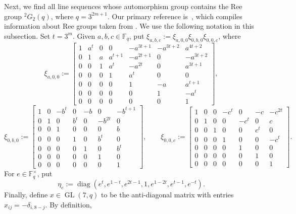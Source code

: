 Next, we find all line sequences whose automorphism group contains the Ree group ${}^2G_2(q)$, where $q = 3^{2m+1}$.
Our primary reference is~\cite[Section~3]{Baarnhielm:14}, which compiles information about Ree groups taken from \cite{HuppertB:82:III,KemperLM:01,Levchuk:85,Ward:66,Wilson:09}.
We use the following notation in this subsection.
Set $t = 3^m$.
Given $a,b,c \in \mathbb{F}_q$, put $\xi_{a,b,c} := \xi_{a,0,0} \xi_{0,b,0} \xi_{0,0,c}$, where
\[
\xi_{a,0,0}
:=
\left[ \begin{array}{ccccccc}
1 & a^t & 0 & 0 & -a^{3t+1} & -a^{3t+2} & a^{4t+2} \\
0 & 1 & a & a^{t+1} & -a^{2t+1} & 0 & -a^{3t+2} \\
0 & 0 & 1 & a^t & -a^{2t} & 0 & a^{3t+1} \\
0 & 0 & 0 & 1 & a^t & 0 & 0 \\
0 & 0 & 0 & 0 & 1 & -a & a^{t+1} \\
0 & 0 & 0 & 0 & 0 & 1 & -a^t \\
0 & 0 & 0 & 0 & 0 & 0 & 1
\end{array} \right],
\]
\[
\xi_{0,b,0}
:=
\left[ \begin{array}{ccccccc}
1 & 0 & -b^t & 0 & -b & 0 & -b^{t+1} \\
0 & 1 & 0 & b^t & 0 & -b^{2t} & 0 \\
0 & 0 & 1 & 0 & 0 & 0 & b \\
0 & 0 & 0 & 1 & 0 & b^t & 0 \\
0 & 0 & 0 & 0 & 1 & 0 & b^t \\
0 & 0 & 0 & 0 & 0 & 1 & 0 \\
0 & 0 & 0 & 0 & 0 & 0 & 1
\end{array} \right],
\qquad
\xi_{0,0,c}
:=
\left[ \begin{array}{ccccccc}
1 & 0 & 0 & -c^t & 0 & -c & -c^{2t} \\
0 & 1 & 0 & 0 & -c^t & 0 & c \\
0 & 0 & 1 & 0 & 0 & c^t & 0 \\
0 & 0 & 0 & 1 & 0 & 0 & -c^t \\
0 & 0 & 0 & 0 & 1 & 0 & 0 \\
0 & 0 & 0 & 0 & 0 & 1 & 0 \\
0 & 0 & 0 & 0 & 0 & 0 & 1
\end{array} \right].
\]
For $e \in \mathbb{F}_q^\times$, put
\[
\eta_e := \operatorname{diag}(e^t, e^{1-t}, e^{2t-1}, 1, e^{1-2t}, e^{t-1}, e^{-t}).
\]
Finally, define $x \in \operatorname{GL}(7,q)$ to be the anti-diagonal matrix with entries $x_{ij} = - \delta_{i,8-j}$.
By definition,

